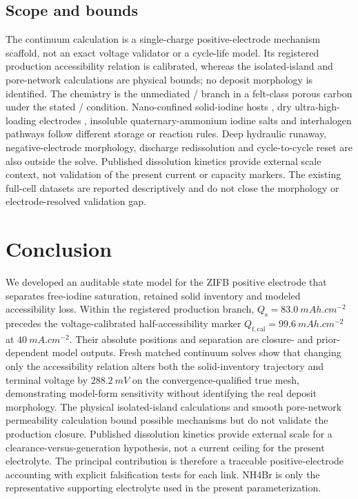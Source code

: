 \documentclass[11pt]{article}
\newcommand{\Qfcal}{Q_{\mathrm{f,cal}}}
\begin{document}
\subsection{Scope and bounds}
The continuum calculation is a single-charge positive-electrode mechanism scaffold, not an exact voltage
validator or a cycle-life model. Its registered production accessibility relation is calibrated, whereas the
isolated-island and pore-network calculations are physical bounds; no deposit morphology is identified. The
chemistry is the unmediated / branch in a felt-class porous carbon under the stated
/ condition. Nano-confined solid-iodine hosts \citep{SolidI2_NatCommun2020}, dry
ultra-high-loading electrodes \citep{WuLoading2025}, insoluble quaternary-ammonium iodine salts and interhalogen
pathways \citep{JiangQA2024,Liao2025} follow different storage or reaction rules. Deep hydraulic runaway,
negative-electrode morphology, discharge redissolution and cycle-to-cycle reset are also outside the solve.
Published dissolution kinetics \citep{Zhao2022} provide external scale context, not validation of the present
current or capacity markers. The existing full-cell datasets are reported descriptively and do not close the
morphology or electrode-resolved validation gap.

\section{Conclusion}
We developed an auditable state model for the ZIFB positive electrode that separates free-iodine saturation,
retained solid inventory and modeled accessibility loss. Within the registered production branch,
$Q_{\mathrm s}=\SI{83.0}{mAh.cm^{-2}}$ precedes the voltage-calibrated half-accessibility marker
$\Qfcal=\SI{99.6}{mAh.cm^{-2}}$ at $\SI{40}{mA.cm^{-2}}$. Their absolute positions and separation are
closure- and prior-dependent model outputs. Fresh matched continuum solves show that changing only the
accessibility relation alters both the solid-inventory trajectory and terminal voltage by
$\SI{288.2}{mV}$ on the convergence-qualified true mesh, demonstrating model-form sensitivity without
identifying the real deposit morphology.
The physical isolated-island calculations and smooth pore-network permeability calculation bound possible
mechanisms but do not validate the production closure. Published dissolution kinetics provide external scale
for a clearance-versus-generation hypothesis, not a current ceiling for the present electrolyte. The principal
contribution is therefore a traceable positive-electrode accounting with explicit falsification tests for each
link. NH4Br is only the representative supporting electrolyte used in the present parameterization.
\end{document}
